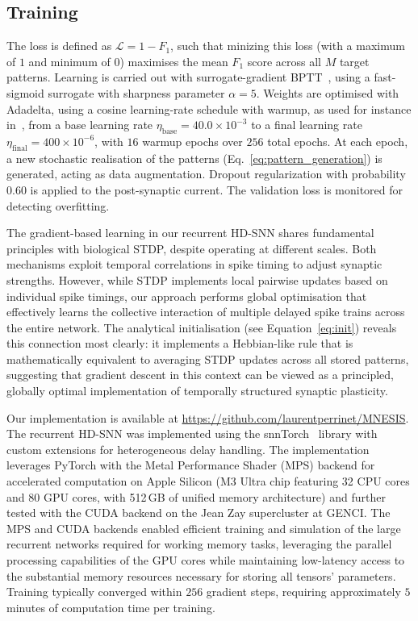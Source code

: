 \documentclass{scrartcl}
\newcommand{\citep}[1]{\parencite{#1}}
\begin{document}
\subsection{Training}

The loss is defined as $\mathcal{L} = 1 - F_1$, such that minizing this loss (with a maximum of $1$ and minimum of $0$) maximises the mean $F_1$ score across all $M$ target patterns. Learning is carried out with surrogate-gradient BPTT~\citep{Neftci2019a}, using a fast-sigmoid surrogate with sharpness parameter $\alpha = 5$. Weights are optimised with Adadelta, using a cosine learning-rate schedule with warmup, as used for instance in~\citep{Hammouamri2023}, from a base learning rate $\eta_\mathrm{base} = 40.0 \times 10^{-3}$ to a final learning rate $\eta_\mathrm{final} = 400 \times 10^{-6}$, with $16$ warmup epochs over $256$ total epochs. At each epoch, a new stochastic realisation of the patterns (Eq.~\ref{eq:pattern_generation}) is generated, acting as data augmentation. Dropout regularization with probability $0.60$ is applied to the post-synaptic current. The validation loss is monitored for detecting overfitting.

The gradient-based learning in our recurrent HD-SNN shares fundamental principles with biological STDP, despite operating at different scales. Both mechanisms exploit temporal correlations in spike timing to adjust synaptic strengths. However, while STDP implements local pairwise updates based on individual spike timings, our approach performs global optimisation that effectively learns the collective interaction of multiple delayed spike trains across the entire network. The analytical initialisation (see Equation~\ref{eq:init}) reveals this connection most clearly: it implements a Hebbian-like rule that is mathematically equivalent to averaging STDP updates across all stored patterns, suggesting that gradient descent in this context can be viewed as a principled, globally optimal implementation of temporally structured synaptic plasticity.

Our implementation is available at \url{https://github.com/laurentperrinet/MNESIS}. The recurrent HD-SNN was implemented using the snnTorch~\citep{Eshraghian2023} library with custom extensions for heterogeneous delay handling. The implementation leverages PyTorch with the Metal Performance Shader (MPS) backend for accelerated computation on Apple Silicon (M3 Ultra chip featuring 32 CPU cores and 80 GPU cores, with 512\,GB of unified memory architecture) and further tested with the CUDA backend on the Jean Zay supercluster at GENCI. The MPS and CUDA backends enabled efficient training and simulation of the large recurrent networks required for working memory tasks, leveraging the parallel processing capabilities of the GPU cores while maintaining low-latency access to the substantial memory resources necessary for storing all tensors' parameters. Training typically converged within $256$ gradient steps, requiring approximately $5$ minutes of computation time per training.
%
\end{document}
